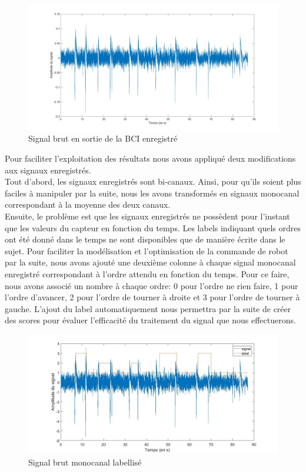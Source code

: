 \documentclass[11pt]{article}
\begin{document}
\begin{figure}[!h]
	\includegraphics[scale=0.25]{images/signalBCIinit.jpg}
	\caption{Signal brut en sortie de la BCI enregistré}
	\label{fig:duck}
\end{figure}

Pour faciliter l'exploitation des résultats nous avons appliqué deux modifications aux signaux enregistrés. \\

Tout d'abord, les signaux enregistrés sont bi-canaux. Ainsi, pour qu'ils soient plus faciles à manipuler par la suite, nous les avons transformés en signaux monocanal correspondant à la moyenne des deux canaux. \\


Ensuite, le problème est que les signaux enregistrés ne possèdent pour l'instant que les valeurs du capteur en fonction du temps. Les labels indiquant quels ordres ont été donné dans le temps ne sont disponibles que de manière écrite dans le sujet. Pour faciliter la modélisation et l'optimisation de la commande de robot par la suite, nous avons ajouté une deuxième colonne à chaque signal monocanal enregistré correspondant à l'ordre attendu en fonction du temps. Pour ce faire, nous avons associé un nombre à chaque ordre: 0 pour l'ordre ne rien faire, 1 pour l'ordre d'avancer, 2 pour l'ordre de tourner à droite et 3 pour l'ordre de tourner à gauche. L'ajout du label automatiquement nous permettra par la suite de créer des scores pour évaluer l'efficacité du traitement du signal que nous effectuerons.

\begin{figure}[!h]
	\includegraphics[scale=0.35]{images/signalBCIlabele.jpg}
	\caption{Signal brut monocanal labellisé}
	\label{fig:duck}
\end{figure}
\end{document}
